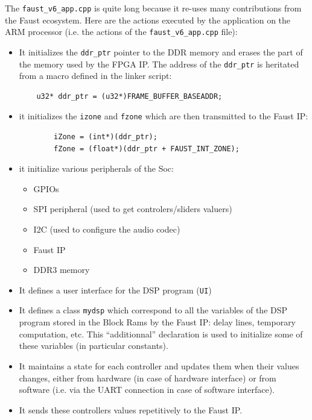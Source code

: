 \documentclass[11pt]{article}
\numberwithin{equation}{section}
\numberwithin{figure}{section}
\begin{document}
The   {\tt faust\_v6\_app.cpp} is quite long because it re-uses many contributions from the Faust ecosystem. Here are the actions executed by the application on the ARM processor (i.e. the actions of the {\tt faust\_v6\_app.cpp} file):
  \begin{itemize}
  \item It initializes the {\tt ddr\_ptr} pointer to the DDR memory and erases the part of the memory used by the FPGA IP. The address of the {\tt ddr\_ptr} is  heritated from a macro defined in the linker script: 
\begin{verbatim}
    u32* ddr_ptr = (u32*)FRAME_BUFFER_BASEADDR;
\end{verbatim}

\item it initializes the {\tt izone} and {\tt fzone} which are then transmitted to the Faust IP:
\begin{verbatim}
        iZone = (int*)(ddr_ptr);
        fZone = (float*)(ddr_ptr + FAUST_INT_ZONE);
\end{verbatim}
\item it initialize various peripherals of the Soc:
  \begin{itemize}
  \item GPIOs
  \item SPI peripheral (used to get controlers/sliders valuers)
  \item I2C (used to configure the audio codec)
  \item Faust IP
  \item DDR3 memory
  \end{itemize}
\item It defines a user interface for the DSP program ({\tt UI})
\item It defines a class {\tt mydsp} which correspond to all the variables of the DSP program  stored in the Block Rams by the Faust IP: delay lines, temporary computation, etc. This ``additionnal'' declaration is used to initialize some of these variables (in particular constants).
  \item It maintains a state for each controller and updates them when their values changes, either from hardware (in case of hardware interface) or from software (i.e. via the UART connection in case of software interface).
  \item It sends these controllers values repetitively to the Faust IP.
  \end{itemize}
\end{document}
